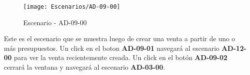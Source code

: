 \begin{figure}[H]
\centering
\texttt{[image: Escenarios/AD-09-00]}
\caption{Escenario - AD-09-00}
\label{fig:AD-09-00}
\end{figure}
Este es el escenario que se muestra luego de crear una venta a partir de uno o más presupuestos. Un click en el boton \textbf{AD-09-01} navegará al escenario \textbf{AD-12-00} para ver la venta recientemente creada. Un click en el botón \textbf{AD-09-02} cerrará la ventana y navegará al escenario \textbf{AD-03-00}.
\\